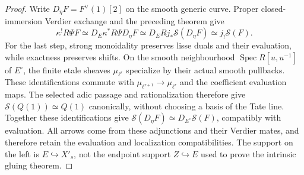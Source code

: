 \documentclass[11pt]{article}
\theoremstyle{definition}
\theoremstyle{remark}
\newcommand{\Spec}{\operatorname{Spec}}
\begin{document}
\begin{proof}
Write $D_\eta F=F^\vee(1)[2]$ on the smooth generic curve.  Proper
closed-immersion Verdier exchange and the preceding theorem give
\[
 \kappa^!R\Psi F
 \simeq D_E\kappa^*R\Psi D_\eta F
 \simeq D_E Rj_*\mathcal S(D_\eta F)
 \simeq j_!\mathcal S(F).
\]
For the last step, strong monoidality preserves lisse duals and
their evaluation, while exactness preserves shifts.  On the smooth
neighbourhood $\Spec R[u,u^{-1}]$ of $E^\circ$, the finite etale
sheaves $\mu_{\ell^r}$ specialize by their actual smooth pullbacks.
These identifications commute with $\mu_{\ell^{r+1}}\to\mu_{\ell^r}$
and the coefficient evaluation maps.  The selected adic passage and
rationalization therefore give $\mathcal S(Q(1))\simeq Q(1)$
canonically, without choosing a basis of the Tate line.  Together
these identifications give $\mathcal S(D_\eta F)\simeq
D_{E^\circ}\mathcal S(F)$, compatibly with evaluation.
All arrows come from these adjunctions and their Verdier mates, and
therefore retain the evaluation and localization compatibilities.
The support on the left is $E\hookrightarrow X'_s$, not the endpoint
support $Z\hookrightarrow E$ used to prove the intrinsic gluing theorem.
\end{proof}
\end{document}
